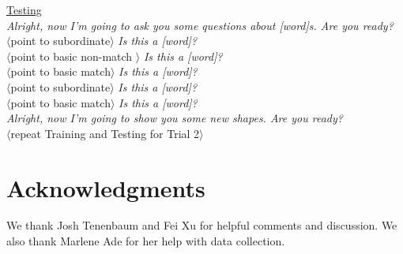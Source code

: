 \documentclass[man]{apa2}
\begin{document}
\noindent \underline{Testing} \\
{\it Alright, now I'm going to ask you some questions about [word]s. Are you ready?} \\
$\langle$point to subordinate$\rangle$ {\it Is this a [word]?} \\
$\langle$point to basic non-match $\rangle$ {\it Is this a [word]?} \\
$\langle$point to basic match$\rangle$ {\it Is this a [word]?}\\
$\langle$point to subordinate$\rangle$ {\it Is this a [word]?} \\
$\langle$point to basic match$\rangle$ {\it Is this a [word]?} \\
 
{\it Alright, now I'm going to show you some new shapes. Are you ready?}\\

\vspace{2.5mm}
\noindent $\langle$repeat Training and Testing for Trial 2$\rangle$ \\

\nocite{re2013}
\nocite{sanchez2003effect}

\section{Acknowledgments}

We thank Josh Tenenbaum and Fei Xu for helpful comments and discussion. We also thank Marlene Ade for her help with data collection. 




\newpage
\theappendix 
\end{document}
